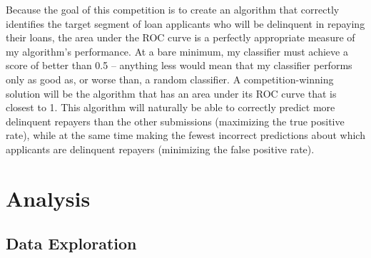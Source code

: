 \documentclass[12pt, letterpaper]{article}
\begin{document}
Because the goal of this competition is to create an algorithm that correctly identifies the target segment of loan applicants who will be delinquent in repaying their loans, the area under the ROC curve is a perfectly appropriate measure of my algorithm's performance. At a bare minimum, my classifier must achieve a score of better than 0.5 -- anything less would mean that my classifier performs only as good as, or worse than, a random classifier. A competition-winning solution will be the algorithm that has an area under its ROC curve that is closest to 1. This algorithm will naturally be able to correctly predict more delinquent repayers than the other submissions (maximizing the true positive rate), while at the same time making the fewest incorrect predictions about which applicants are delinquent repayers (minimizing the false positive rate).

\section{Analysis}
\subsection{Data Exploration}
\end{document}
